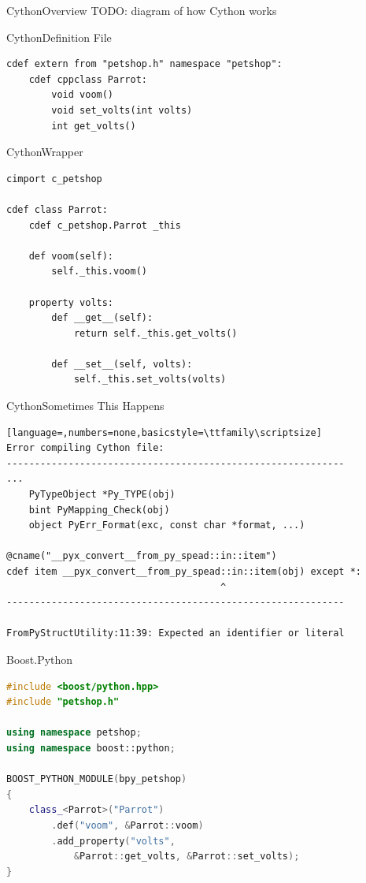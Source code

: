 \documentclass{beamer}
\begin{document}
\begin{frame}{Cython}{Overview}
  TODO: diagram of how Cython works
\end{frame}

\begin{frame}[fragile=singleslide]{Cython}{Definition File}
  \begin{lstlisting}[language=cython]
cdef extern from "petshop.h" namespace "petshop":
    cdef cppclass Parrot:
        void voom()
        void set_volts(int volts)
        int get_volts()
  \end{lstlisting}
\end{frame}

\begin{frame}[fragile=singleslide]{Cython}{Wrapper}
  \begin{lstlisting}[language=cython]
cimport c_petshop

cdef class Parrot:
    cdef c_petshop.Parrot _this

    def voom(self):
        self._this.voom()

    property volts:
        def __get__(self):
            return self._this.get_volts()

        def __set__(self, volts):
            self._this.set_volts(volts)
  \end{lstlisting}
\end{frame}

\begin{frame}[fragile=singleslide]{Cython}{Sometimes This Happens}
  \begin{lstlisting}[language=,numbers=none,basicstyle=\ttfamily\scriptsize]
Error compiling Cython file:
------------------------------------------------------------
...
    PyTypeObject *Py_TYPE(obj)
    bint PyMapping_Check(obj)
    object PyErr_Format(exc, const char *format, ...)

@cname("__pyx_convert__from_py_spead::in::item")
cdef item __pyx_convert__from_py_spead::in::item(obj) except *:
                                      ^
------------------------------------------------------------

FromPyStructUtility:11:39: Expected an identifier or literal
  \end{lstlisting}
\end{frame}

\begin{frame}[fragile=singleslide]{Boost.Python}
  \begin{lstlisting}[language=c++]
#include <boost/python.hpp>
#include "petshop.h"

using namespace petshop;
using namespace boost::python;

BOOST_PYTHON_MODULE(bpy_petshop)
{
    class_<Parrot>("Parrot")
        .def("voom", &Parrot::voom)
        .add_property("volts",
            &Parrot::get_volts, &Parrot::set_volts);
}
  \end{lstlisting}
\end{frame}
\end{document}
